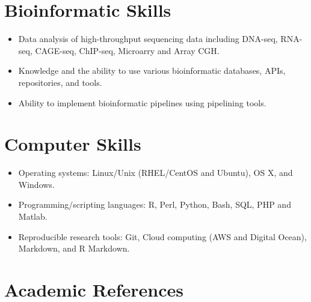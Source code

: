 \documentclass[a4paper, 10pt]{article}
\begin{document}
\section*{Bioinformatic Skills}

\begin{itemize}
   \setlength\itemsep{0em}
   \item Data analysis of high-throughput sequencing data including DNA-seq, RNA-seq, CAGE-seq, ChIP-seq, Microarry and Array CGH.
   \item Knowledge and the ability to use various bioinformatic databases, APIs, repositories, and tools.
   \item Ability to implement bioinformatic pipelines using pipelining tools.
\end{itemize}

\section*{Computer Skills}

\begin{itemize}
   \setlength\itemsep{0em}
   \item Operating systems: Linux/Unix (RHEL/CentOS and Ubuntu), OS X, and Windows.
   \item Programming/scripting languages: R, Perl, Python, Bash, SQL, PHP and Matlab.
   \item Reproducible research tools: Git, Cloud computing (AWS and Digital Ocean), Markdown, and R Markdown.
\end{itemize}


\section*{Academic References}
\end{document}
